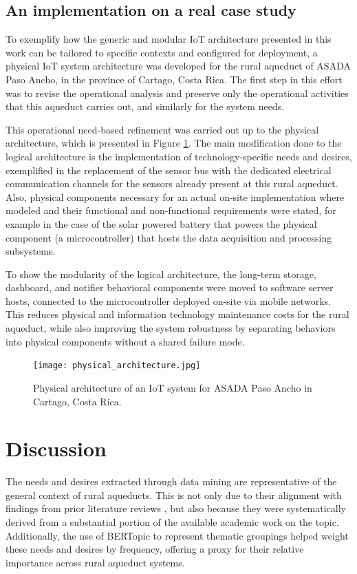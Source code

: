 \documentclass[conference]{IEEEtran}
\begin{document}
\subsection{An implementation on a real case study} 
To exemplify how the generic and modular IoT architecture presented in this work can be tailored to specific
contexts and configured for deployment, a physical IoT system architecture was developed for the rural aqueduct of ASADA
Paso Ancho, in the province of Cartago, Costa Rica.
The first step in this effort was to revise the operational analysis and preserve only the operational activities that this
aqueduct carries out, and similarly for the system needs.

This operational need-based refinement was carried out up to the physical architecture, which is presented in
Figure \ref{fig:pa}.
The main modification done to the logical architecture is the implementation of technology-specific needs and desires, exemplified in the
replacement of the sensor bus with the dedicated
electrical communication channels for the sensors already present at this rural aqueduct.
Also, physical components necessary for an actual on-site implementation where modeled and their functional and
non-functional requirements were stated, for example in the case of the solar powered battery that powers
the physical component (a microcontroller) that hosts the data acquisition and processing subsystems.

To show the modularity of the logical architecture, the long-term storage, dashboard, and notifier behavioral
components were moved to software server hosts, connected to the microcontroller deployed on-site via
mobile networks. This reduces physical and information technology maintenance costs for the rural aqueduct,
while also improving the system robustness by separating behaviors into physical components without a shared
failure mode.

\begin{figure}[hbt] 
    \centering
    \texttt{[image: physical\_architecture.jpg]}
    \caption{Physical architecture of an IoT system for ASADA Paso Ancho in Cartago, Costa Rica.}
    \label{fig:pa}
\end{figure}

\section{Discussion}
The needs and desires extracted through data mining are representative of the general context of rural aqueducts. This is not only due to their alignment with findings from prior literature reviews \cite{w14223621} \cite{98953990}, but also because they were systematically derived from a substantial portion of the available academic work on the topic. Additionally, the use of BERTopic to represent thematic groupings helped weight these needs and desires by frequency, offering a proxy for their relative importance across rural aqueduct systems.
\end{document}
